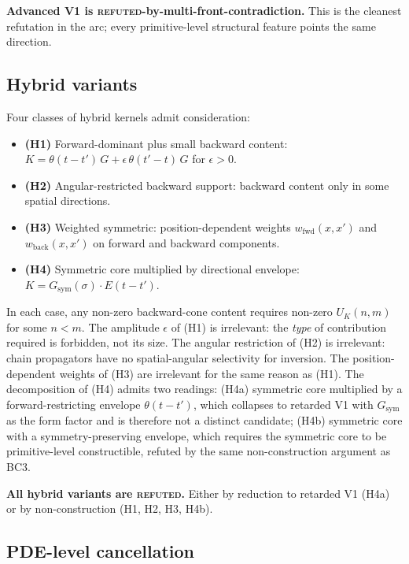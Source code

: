 \documentclass[11pt,a4paper]{article}
\begin{document}
\textbf{Advanced V1 is \textsc{refuted}-by-multi-front-contradiction.} This is the cleanest refutation in the arc; every primitive-level structural feature points the same direction.

\subsection{Hybrid variants}

Four classes of hybrid kernels admit consideration:
\begin{itemize}[leftmargin=1.5em]
  \item \textbf{(H1)} Forward-dominant plus small backward content: $K = \theta(t-t')\,G + \epsilon\,\theta(t'-t)\,G$ for $\epsilon > 0$.
  \item \textbf{(H2)} Angular-restricted backward support: backward content only in some spatial directions.
  \item \textbf{(H3)} Weighted symmetric: position-dependent weights $w_\mathrm{fwd}(x,x')$ and $w_\mathrm{back}(x,x')$ on forward and backward components.
  \item \textbf{(H4)} Symmetric core multiplied by directional envelope: $K = G_\mathrm{sym}(\sigma) \cdot E(t-t')$.
\end{itemize}

In each case, any non-zero backward-cone content requires non-zero $U_K(n, m)$ for some $n < m$. The amplitude $\epsilon$ of (H1) is irrelevant: the \emph{type} of contribution required is forbidden, not its size. The angular restriction of (H2) is irrelevant: chain propagators have no spatial-angular selectivity for inversion. The position-dependent weights of (H3) are irrelevant for the same reason as (H1). The decomposition of (H4) admits two readings: (H4a) symmetric core multiplied by a forward-restricting envelope $\theta(t-t')$, which collapses to retarded V1 with $G_\mathrm{sym}$ as the form factor and is therefore not a distinct candidate; (H4b) symmetric core with a symmetry-preserving envelope, which requires the symmetric core to be primitive-level constructible, refuted by the same non-construction argument as BC3.

\textbf{All hybrid variants are \textsc{refuted}.} Either by reduction to retarded V1 (H4a) or by non-construction (H1, H2, H3, H4b).

\subsection{PDE-level cancellation}
\end{document}
